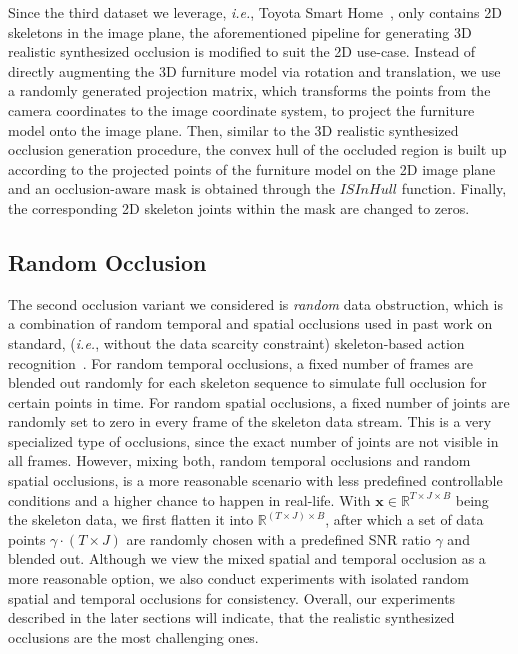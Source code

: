 \documentclass[lettersize,journal]{IEEEtran}
\begin{document}
Since the third dataset we leverage, \textit{i.e.}, Toyota Smart Home~\cite{Das_2019_ICCV}, only contains 2D skeletons in the image plane, the aforementioned pipeline for generating 3D realistic synthesized occlusion is modified to suit the 2D use-case.
Instead of directly augmenting the 3D furniture model via rotation and translation, we use a randomly generated projection matrix, which transforms the points from the camera coordinates to the image coordinate system, to project the furniture model onto the image plane. 
Then, similar to the 3D realistic synthesized occlusion generation procedure, the convex hull of the occluded region is built up according to the projected points of the furniture model on the 2D image plane and an occlusion-aware mask is obtained through the $ISInHull$ function. 
Finally, the corresponding 2D skeleton joints within the mask are changed to zeros.

\subsection{Random Occlusion}
\label{benchmark:random}

The second occlusion variant we considered is \textit{random} data obstruction, which is a combination of random temporal and spatial occlusions used in past work on standard, (\textit{i.e.}, without the data scarcity constraint) skeleton-based action recognition~\cite{song2019richly,song2020richly}.
For random temporal occlusions, a fixed number of frames are blended out randomly for each skeleton sequence to simulate full occlusion for certain points in time.
For random spatial occlusions, a fixed number of joints are  randomly set to zero in every frame of the skeleton data stream. This is a very specialized type of occlusions, since the exact number of joints are not visible in all frames.
However, mixing both, random temporal occlusions and random spatial occlusions, is a more reasonable scenario with less predefined controllable conditions and a higher chance to happen in real-life.
With $\textbf{x}\in \mathbb{R}^{T\times J \times B}$ being the skeleton data, we first flatten it into $\mathbb{R}^{(T\times J) \times B}$, after which a set of data points $\gamma \cdot (T\times J)$ are randomly chosen with a predefined SNR ratio $\gamma$ and blended out.
Although we view the mixed spatial and temporal occlusion as a more reasonable option, we also conduct experiments with isolated random spatial and temporal occlusions for consistency.
Overall, our experiments described in the later sections will indicate, that the realistic synthesized occlusions are the most challenging ones.
\end{document}

